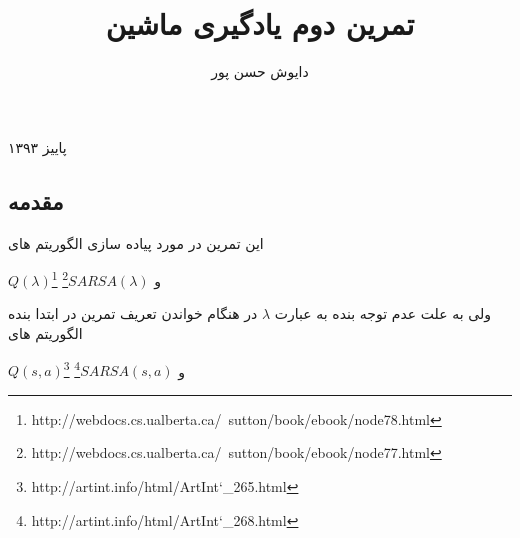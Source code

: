 \documentclass[10pt,a4paper]{article}
\begin{document}
\title{\textarabic{تمرین دوم یادگیری ماشین}}
\author{\textarabic{دایوش حسن پور}}
\date{}
\maketitle
\null
\vfill
\begin{center}
\textarabic{پاییز ۱۳۹۳}
\end{center}
\newpage

\begin{Arabic}
\section{\textarabic{مقدمه}}
این تمرین در مورد پیاده سازی الگوریتم های 
\end{Arabic}
\textenglish{$Q(\lambda)$\footnote{http://webdocs.cs.ualberta.ca/~sutton/book/ebook/node78.html}}
\textarabic{و}
\textenglish{$SARSA(\lambda)$\footnote{http://webdocs.cs.ualberta.ca/~sutton/book/ebook/node77.html}}
\begin{Arabic}
ولی به علت عدم توجه بنده به عبارت 
$\lambda$
در هنگام خواندن تعریف تمرین در ابتدا بنده الگوریتم های 
\end{Arabic}
\textenglish{$Q(s, a)$\footnote{http://artint.info/html/ArtInt\char`_265.html}}
\textarabic{و}
\textenglish{$SARSA(s, a)$\footnote{http://artint.info/html/ArtInt\char`_268.html}}
\end{document}
